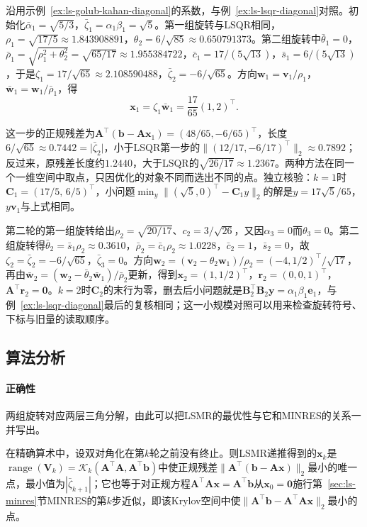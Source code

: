 \begin{example}[不相容矩形系统上的LSMR]
\label{ex:ls-lsmr-diagonal}
沿用示例~\ref{ex:ls-golub-kahan-diagonal}的系数，与例~\ref{ex:ls-lsqr-diagonal}对照。初始化$\bar\alpha_1=\sqrt{5/3}$，$\bar\zeta_1=\alpha_1\beta_1=\sqrt5$。第一组旋转与LSQR相同，$\rho_1=\sqrt{17/5}\approx1.843908891$，$\theta_2=6/\sqrt{85}\approx0.650791373$。第二组旋转中$\bar\theta_1=0$，$\bar\rho_1=\sqrt{\rho_1^2+\theta_2^2}=\sqrt{65/17}\approx1.955384722$，$\bar c_1=17/(5\sqrt{13})$，$\bar s_1=6/(5\sqrt{13})$，于是$\zeta_1=17/\sqrt{65}\approx2.108590488$，$\bar\zeta_2=-6/\sqrt{65}$。方向$\bm w_1=\bm v_1/\rho_1$，$\bar{\bm w}_1=\bm w_1/\bar\rho_1$，得
\[
 \bm x_1=\zeta_1\bar{\bm w}_1=\frac{17}{65}(1,2)^\top .
\]

这一步的正规残差为$\bm A^\top(\bm b-\bm A\bm x_1)=(48/65,-6/65)^\top$，长度$6/\sqrt{65}\approx0.7442=\lvert\bar\zeta_2\rvert$，小于LSQR第一步的$\lVert(12/17,-6/17)^\top\rVert_2\approx0.7892$；反过来，原残差长度约$1.2440$，大于LSQR的$\sqrt{26/17}\approx1.2367$。两种方法在同一个一维空间中取点，只因优化的对象不同而选出不同的点。独立核验：$k=1$时$\bm C_1=(17/5,\,6/5)^\top$，小问题$\min_y\lVert(\sqrt5,0)^\top-\bm C_1y\rVert_2$的解是$y=17\sqrt5/65$，$y\bm v_1$与上式相同。

第二轮的第一组旋转给出$\rho_2=\sqrt{20/17}$、$c_2=3/\sqrt{26}$，又因$\alpha_3=0$而$\theta_3=0$。第二组旋转得$\bar\theta_2=\bar s_1\rho_2\approx0.3610$，$\bar\rho_2=\bar c_1\rho_2\approx1.0228$，$\bar c_2=1$，$\bar s_2=0$，故$\zeta_2=\bar\zeta_2=-6/\sqrt{65}$，$\bar\zeta_3=0$。方向$\bm w_2=(\bm v_2-\theta_2\bm w_1)/\rho_2=(-4,1/2)^\top/\sqrt{17}$，再由$\bar{\bm w}_2=(\bm w_2-\bar\theta_2\bar{\bm w}_1)/\bar\rho_2$更新，得到$\bm x_2=(1,1/2)^\top$，$\bm r_2=(0,0,1)^\top$，$\bm A^\top\bm r_2=\bm0$。$k=2$时$\bm C_2$的末行为零，删去后小问题就是$\bm B_2^\top\bm B_2\bm y=\alpha_1\beta_1\bm e_1$，与例~\ref{ex:ls-lsqr-diagonal}最后的复核相同；这一小规模对照可以用来检查旋转符号、下标与旧量的读取顺序。
\end{example}

\subsection{算法分析}

\paragraph{正确性}
两组旋转对应两层三角分解，由此可以把LSMR的最优性与它和MINRES的关系一并写出。

\begin{theorem}[LSMR的最小正规残差性及与MINRES的等价]
\label{thm:ls-lsmr-minres-equivalence}
在精确算术中，设双对角化在第$k$轮之前没有终止。则LSMR递推得到的$\bm x_k$是$\operatorname{range}(\bm V_k)=\mathcal K_k(\bm A^\top\bm A,\bm A^\top\bm b)$中使正规残差$\lVert\bm A^\top(\bm b-\bm A\bm x)\rVert_2$最小的唯一点，最小值为$|\bar\zeta_{k+1}|$；它也等于对正规方程$\bm A^\top\bm A\bm x=\bm A^\top\bm b$从$\bm x_0=\bm0$施行第~\ref{sec:ls-minres}节MINRES的第$k$步近似，即该Krylov空间中使$\lVert\bm A^\top\bm b-\bm A^\top\bm A\bm x\rVert_2$最小的点。
\end{theorem}

